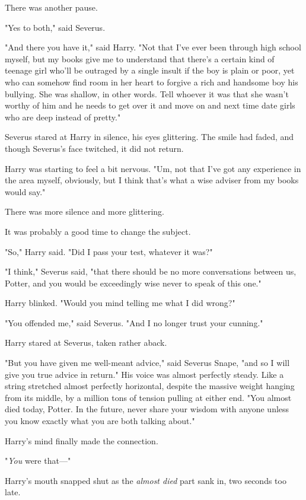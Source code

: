 There was another pause.

"Yes to both," said Severus.

"And there you have it," said Harry. "Not that I've ever been through high
school myself, but my books give me to understand that there's a certain kind
of teenage girl who'll be outraged by a single insult if the boy is plain or
poor, yet who can somehow find room in her heart to forgive a rich and handsome
boy his bullying. She was shallow, in other words. Tell whoever it was that she
wasn't worthy of him and he needs to get over it and move on and next time date
girls who are deep instead of pretty."

Severus stared at Harry in silence, his eyes glittering. The smile had faded,
and though Severus's face twitched, it did not return.

Harry was starting to feel a bit nervous. "Um, not that I've got any experience
in the area myself, obviously, but I think that's what a wise adviser from my
books would say."

There was more silence and more glittering.

It was probably a good time to change the subject.

"So," Harry said. "Did I pass your test, whatever it was?"

"I think," Severus said, "that there should be no more conversations between
us, Potter, and you would be exceedingly wise never to speak of this one."

Harry blinked. "Would you mind telling me what I did wrong?"

"You offended me," said Severus. "And I no longer trust your cunning."

Harry stared at Severus, taken rather aback.

"But you have given me well-meant advice," said Severus Snape, "and so I will
give you true advice in return." His voice was almost perfectly steady. Like a
string stretched almost perfectly horizontal, despite the massive weight
hanging from its middle, by a million tons of tension pulling at either end.
"You almost died today, Potter. In the future, never share your wisdom with
anyone unless you know exactly what you are both talking about."

Harry's mind finally made the connection.

"\emph{You} were that---"

Harry's mouth snapped shut as the \emph{almost died} part sank in, two seconds
too late.

